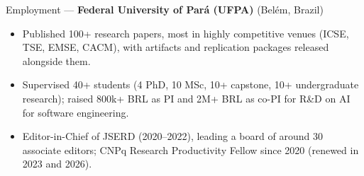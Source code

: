 \begin{rubric}{Employment}
\entry*[2017--now]
   --- \textbf{Federal University of Pará (UFPA)} (Belém, Brazil)
  \begin{itemize}
  \item Published 100+ research papers, most in highly competitive venues (ICSE, TSE, EMSE, CACM),
    with artifacts and replication packages released alongside them.
  \item Supervised 40+ students (4 PhD, 10 MSc, 10+ capstone, 10+ undergraduate research);
    raised 800k+ BRL as PI and 2M+ BRL as co-PI for R\&D on AI for software engineering.
  \item Editor-in-Chief of JSERD (2020--2022), leading a board of around 30 associate editors;
    CNPq Research Productivity Fellow since 2020 (renewed in 2023 and 2026).
  \end{itemize}

\end{rubric}
